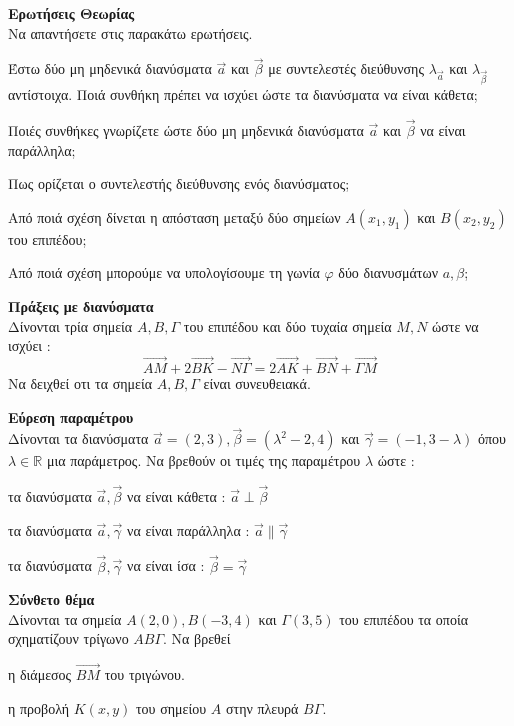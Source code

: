 \documentclass[ektypwsh]{diag-xelatex}
\begin{document}
\begin{thema}
\item \textbf{Ερωτήσεις Θεωρίας}\\
Να απαντήσετε στις παρακάτω ερωτήσεις.
\begin{rlist}
\item Έστω δύο μη μηδενικά διανύσματα $ \vec{a} $ και $ \vec{\beta} $ με συντελεστές διεύθυνσης $ \lambda_{\vec{a}} $ και $ \lambda_{\vec{\beta}} $ αντίστοιχα. Ποιά συνθήκη πρέπει να ισχύει ώστε τα διανύσματα να είναι κάθετα;
\item Ποιές συνθήκες γνωρίζετε ώστε δύο μη μηδενικά διανύσματα $ \vec{a} $ και $ \vec{\beta} $ να είναι παράλληλα;
\item Πως ορίζεται ο συντελεστής διεύθυνσης ενός διανύσματος;
\item Από ποιά σχέση δίνεται η απόσταση μεταξύ δύο σημείων $ A(x_1,y_1) $ και $ B(x_2,y_2) $ του επιπέδου;
\item Από ποιά σχέση μπορούμε να υπολογίσουμε τη γωνία $ \varphi $ δύο διανυσμάτων $ a,\beta $;
\end{rlist}
\item \textbf{Πράξεις με διανύσματα}\\
Δίνονται τρία σημεία $ A,B,\varGamma $ του επιπέδου και δύο τυχαία σημεία $ M,N $ ώστε να ισχύει :
\[ \overrightarrow{AM}+2\overrightarrow{BK}-\overrightarrow{N\varGamma}=2\overrightarrow{AK}+\overrightarrow{BN}+\overrightarrow{\varGamma M} \]
Να δειχθεί οτι τα σημεία $ A,B,\varGamma $ είναι συνευθειακά.
\item \textbf{Εύρεση παραμέτρου}\\
Δίνονται τα διανύσματα $ \vec{a}=(2,3), \vec{\beta}=(\lambda^2-2,4) $ και $ \vec{\gamma}=(-1,3-\lambda) $ όπου $ \lambda\in\mathbb{R} $ μια παράμετρος. Να βρεθούν οι τιμές της παραμέτρου $ \lambda $ ώστε :
\begin{rlist}
\item τα διανύσματα $ \vec{a},\vec{\beta} $ να είναι κάθετα : $ \vec{a}\perp\vec{\beta} $
\item τα διανύσματα $ \vec{a},\vec{\gamma} $ να είναι παράλληλα : $ \vec{a}\parallel\vec{\gamma} $
\item τα διανύσματα $ \vec{\beta},\vec{\gamma} $ να είναι  ίσα : $ \vec{\beta}=\vec{\gamma} $
\end{rlist}
\item \textbf{Σύνθετο θέμα}\\
Δίνονται τα σημεία $ A(2,0), B(-3,4) $ και $ \varGamma(3,5) $ του επιπέδου τα οποία σχηματίζουν τρίγωνο $ AB\varGamma $. Να βρεθεί
\begin{rlist}
\item η διάμεσος $ \overrightarrow{BM} $ του τριγώνου. 
\item η προβολή $ K(x,y) $ του σημείου $ A $ στην πλευρά $ B\varGamma $.
\end{rlist}
\end{thema}
\end{document}

